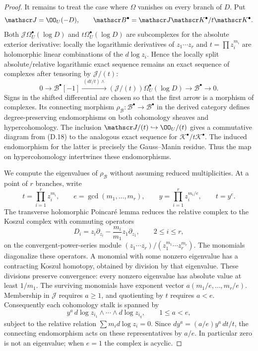 \begin{proof}
It remains to treat the case where $\Omega$ vanishes on every
branch of $D$. Put
\[
 \mathscr J=\OO_U(-D),\qquad
 \mathscr B^\bullet=
 \mathscr J\mathscr K^\bullet/t\mathscr K^\bullet.
\]
Both $\mathscr J\Omega_U^\bullet(\log D)$ and
$t\Omega_U^\bullet(\log D)$ are subcomplexes for the absolute
exterior derivative: locally the logarithmic derivatives of
$z_1\cdots z_r$ and $t=\prod z_i^{m_i}$ are holomorphic
linear combinations of the $d\log z_i$. Hence the locally split
absolute/relative logarithmic exact sequence remains an exact
sequence of complexes after tensoring by $\mathscr J/(t)$:
\[
0\longrightarrow\mathscr B^\bullet[-1]
 \xrightarrow{\ (dt/t)\wedge\ }
 (\mathscr J/(t))\Omega_U^\bullet(\log D)
 \longrightarrow\mathscr B^\bullet\longrightarrow0.
\tag{D.18}
\]
Signs in the shifted differential are chosen so that the first
arrow is a morphism of complexes. Its connecting morphism
$\rho_{\mathscr B}:\mathscr B^\bullet\to\mathscr B^\bullet$
in the derived category defines degree-preserving endomorphisms
on both cohomology sheaves and hypercohomology. The inclusion
$\mathscr J/(t)\hookrightarrow\OO_U/(t)$ gives a commutative
diagram from (D.18) to the analogous exact sequence for
$\mathscr K^\bullet/t\mathscr K^\bullet$. The induced
endomorphism for the latter is precisely the Gauss--Manin
residue. Thus the map on hypercohomology intertwines these
endomorphisms.

We compute the eigenvalues of $\rho_{\mathscr B}$ without
assuming reduced multiplicities. At a point of $r$ branches,
write
\[
 t=\prod_{i=1}^r z_i^{m_i},\qquad
 e=\gcd(m_1,\ldots,m_r),\qquad
 y=\prod_{i=1}^r z_i^{m_i/e},\qquad t=y^e.
\]
The transverse holomorphic Poincar\'e lemma reduces the relative
complex to the Koszul complex with commuting operators
\[
 D_i=z_i\partial_{z_i}
           -\frac{m_i}{m_1}z_1\partial_{z_1},
 \qquad 2\le i\le r,
\]
on the convergent-power-series module
$(z_1\cdots z_r)/(z_1^{m_1}\cdots z_r^{m_r})$.
The monomials diagonalize these operators. A monomial with some
nonzero eigenvalue has a contracting Koszul homotopy, obtained
by division by that eigenvalue. These divisions preserve
convergence: every nonzero eigenvalue has absolute value at
least $1/m_1$. The surviving monomials have exponent vector
$a(m_1/e,\ldots,m_r/e)$. Membership in $\mathscr J$ requires
$a\ge1$, and quotienting by $t$ requires $a<e$. Consequently
each cohomology stalk is spanned by
\[
 y^a\,d\log z_{i_1}\wedge\cdots\wedge d\log z_{i_q},
 \qquad 1\le a<e,
\]
subject to the relative relation $\sum m_i d\log z_i=0$.
Since $dy^a=(a/e)y^a\,dt/t$, the connecting endomorphism
acts on these representatives by $a/e$. In particular zero is
not an eigenvalue; when $e=1$ the complex is acyclic.


\end{proof}
